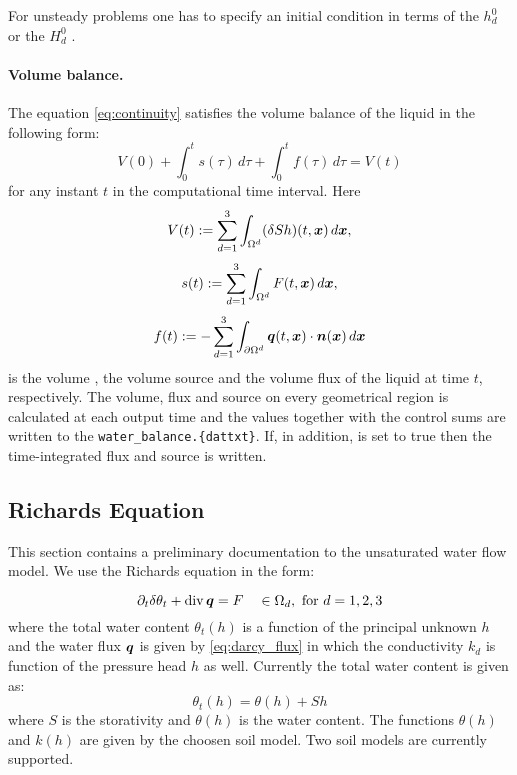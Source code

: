For unsteady problems one has to specify an initial condition in terms of the 
$h_d^0$ 
or the 
$H_d^0$ .

\paragraph{Volume balance.}
The equation \eqref{eq:continuity} satisfies the volume balance of the liquid in the following form:
\[ V(0) + \int_0^t s(\tau) \,d\tau + \int_0^t f(\tau) \,d\tau = V(t) \]
for any instant $t$ in the computational time interval.
Here
$$ V(t) := \sum_{d=1}^3\int_{\Omega^d}(\delta S h)(t,\mathbf{\boldsymbol{x}})\,d\mathbf{\boldsymbol{x}}, $$
$$ s(t) := \sum_{d=1}^3\int_{\Omega^d}F(t,\mathbf{\boldsymbol{x}})\,d\mathbf{\boldsymbol{x}}, $$
$$ f(t) := -\sum_{d=1}^3\int_{\partial\Omega^d}\mathbf{\boldsymbol{q}}(t,\mathbf{\boldsymbol{x}})\cdot\mathbf{\boldsymbol{n}}(\mathbf{\boldsymbol{x}}) \,d\mathbf{\boldsymbol{x}} $$
is the volume , the volume source  and the volume flux  of the liquid at time $t$, respectively.
The volume, flux and source on every geometrical region is calculated at each output time and the values together with the control sums are written to the  \texttt{water\_balance.\{dat\textbar txt\}}.
If, in addition,  is set to true then the time-integrated flux and source is written.

\subsection{Richards Equation}
This section contains a preliminary documentation to the unsaturated water flow model. We use the Richards equation in the form:

\begin{equation}
 \partial_t \delta \theta_t + \operatorname{div} \mathbf{\boldsymbol{q}} = F\quad \in\Omega_d, \text{ for } d=1,2,3
\end{equation}
where the total water content $\theta_t(h)$ \units{}{}{} is a function of the principal unknown $h$ and the water flux $\mathbf{\boldsymbol{q}}$ is given by \eqref{eq:darcy_flux} 
in which the conductivity $k_d$ is function of the pressure head $h$ as well.
Currently the total water content is given as:
\begin{equation}
    \theta_t(h) = \theta(h) + Sh
\end{equation}
where $S$ is the storativity and $\theta(h)$ is the water content. The functions $\theta(h)$ and $k(h)$ are given by the choosen soil model.
Two soil models are currently supported.

